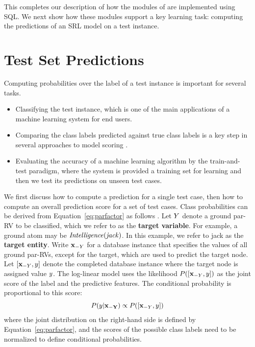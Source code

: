 This completes our description of how the modules of \FB  are implemented using SQL. We next show how these modules support a key learning task: computing the predictions of an SRL model on a test instance. 

\section{Test Set Predictions} Computing probabilities over the label of a test instance is important for several tasks. 

\begin{itemize}
\item Classifying the test instance, which is one of the main applications of a machine learning system for end users.
\item Comparing the class labels predicted against true class labels is a key step in several approaches to model scoring \cite{Kimmig2015}. 
\item Evaluating the accuracy of a machine learning algorithm by the train-and-test paradigm, where the system is provided a training set for learning and then we test its predictions on unseen test cases.
\end{itemize}

We first discuss how to compute a prediction for a single test case, then how to compute an overall prediction score for a set of test cases. Class probabilities can be derived from Equation~\ref{eq:parfactor} as follows \cite[Sec.2.2.2]{Kimmig2015}. Let $Y$ denote a ground par-RV to be classified, which we refer to as the \textbf{target variable}. For example, a ground atom may be $\it{Intelligence}(jack)$. In this example, we refer to jack as the \textbf{target entity}. Write $\mathbf{x}_{-Y}$ for a database instance that specifies the values of all ground par-RVs, except for the target, which are used to predict the target node. Let $[\mathbf{x}_{-Y},y]$ denote the completed database instance where the target node is assigned value $y$. The log-linear model uses the likelihood $P([\mathbf{x}_{-Y},y])$ as the joint score of the label and the predictive features. The conditional probability is proportional to this score:
\begin{equation} \label{eq:classify}
P(y|\mathbf{x_{-Y}}) \propto P([\mathbf{x}_{-Y},y])
\end{equation}
where the joint distribution on the right-hand side is defined by Equation~\ref{eq:parfactor}, and the scores of the possible class labels need to be normalized to define  conditional probabilities. 


